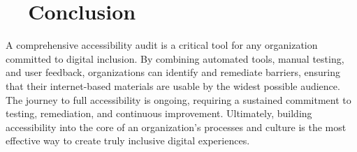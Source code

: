 \section{~~Conclusion}
\label{sec:conclusion-auditing}
A comprehensive accessibility audit is a critical tool for any organization committed to digital inclusion. By combining automated tools, manual testing, and user feedback, organizations can identify and remediate  barriers, ensuring that their internet-based materials are usable by the widest possible audience. The journey to full accessibility is ongoing, requiring a sustained commitment to testing, remediation, and continuous improvement. Ultimately, building accessibility into the core of an organization's processes and culture is the most effective way to create truly inclusive digital experiences.
\supercite{Thatcher2006}
